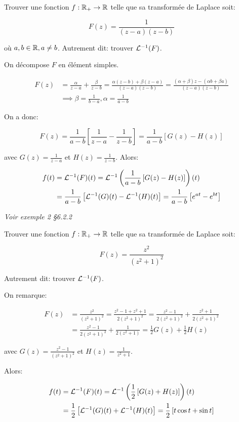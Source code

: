 \begin{example}[1]
    Trouver une fonction $f: \mathbb{R}_+ \rightarrow \mathbb{R}$ telle que sa transformée de Laplace soit:
    
    \[ F(z) = \frac{1}{(z-a)(z-b)} \]
    
    où $a, b \in \mathbb{R}, a \neq b$.
    Autrement dit: trouver $\mathcal{L}^{-1}(F)$.
    
    On décompose $F$ en élément simples.
    
    \begin{align*}
        F(z) &= \frac{\alpha}{z - a} + \frac{\beta}{z - b}
        = \frac{\alpha (z - b) + \beta (z-a)}{(z-a)(z-b)}
        = \frac{(\alpha + \beta) z - (\alpha b + \beta a)}{(z-a)(z-b)}
        \\&\implies \beta = \frac{1}{b - a}, \alpha = \frac{1}{a - b}
    \end{align*}
    
    On a donc:
    
    \[ F(z) = \frac{1}{a - b} \left[\frac{1}{z - a} - \frac{1}{z - b}\right] = \frac{1}{a - b} \left[G(z) - H(z)\right] \]
    
    avec $G(z) = \frac{1}{z - a}$ et $H(z) = \frac{1}{z - b}$.
    Alors:
    
    \begin{align*}
        f(t) &= \mathcal{L}^{-1}(F)(t)
        = \mathcal{L}^{-1}\left(\frac{1}{a - b} \left[G(z) - H(z)\right]\right)(t)
        \\&= \frac{1}{a - b} \left[ \mathcal{L}^{-1}(G)(t) - \mathcal{L}^{-1}(H)(t) \right]
        = \frac{1}{a - b} \left[ e^{at} - e^{bt} \right]
    \end{align*}
    
    \textit{Voir exemple 2 §6.2.2}
\end{example}


\begin{example}[2]
    Trouver une fonction $f: \mathbb{R}_+ \rightarrow \mathbb{R}$ telle que sa transformée de Laplace soit:
    
    \[ F(z) = \frac{z^2}{(z^2+1)^2} \]
    
    Autrement dit: trouver $\mathcal{L}^{-1}(F)$.
    
    On remarque:
    
    \begin{align*}
    F(z) &= \frac{z^2}{(z^2+1)^2}
    = \frac{z^2 - 1 + z^2 + 1}{2(z^2+1)^2}
    = \frac{z^2 - 1}{2(z^2+1)^2} + \frac{z^2 + 1}{2(z^2+1)^2}
    \\&= \frac{z^2 - 1}{2(z^2+1)^2} + \frac{1}{2(z^2+1)}
    = \frac{1}{2} G(z) + \frac{1}{2} H(z)
    \end{align*}
    
    avec $G(z) = \frac{z^2 - 1}{(z^2+1)^2}$ et $H(z) = \frac{1}{z^2+1}$.
    
    Alors:
    
    \begin{align*}
    f(t) &= \mathcal{L}^{-1}(F)(t)
    = \mathcal{L}^{-1}\left(\frac{1}{2} \left[G(z) + H(z)\right]\right)(t)
    \\&= \frac{1}{2} \left[ \mathcal{L}^{-1}(G)(t) + \mathcal{L}^{-1}(H)(t) \right]
    = \frac{1}{2} \left[ t \cos t +  \sin t \right]
    \end{align*}
\end{example}


